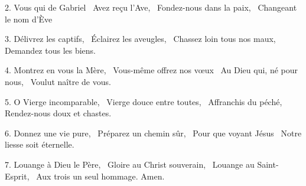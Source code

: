 \noindent
{}

{2. Vous qui de Gabriel~\newline
Avez reçu l'Ave,~\newline
Fondez-nous dans la paix,~\newline
Changeant le nom d'Ève~}

{3. Délivrez les captifs,~\newline
Éclairez les aveugles,~\newline
Chassez loin tous nos maux,~\newline
Demandez tous les biens.}

{4. Montrez en vous la Mère,~\newline
Vous-même offrez nos v{\oe}ux~\newline
Au Dieu qui, né pour nous,~\newline
Voulut naître de vous.}

{5. O Vierge incomparable,~\newline
Vierge douce entre toutes,~\newline
Affranchis du péché,~\newline
Rendez-nous doux et chastes.}

{6. Donnez une vie pure,~\newline
Préparez un chemin sûr,~\newline
Pour que voyant Jésus~\newline
Notre liesse soit éternelle.}

{7. Louange à Dieu le Père,~\newline
Gloire au Christ souverain,~\newline
Louange au Saint-Esprit,~\newline
Aux trois un seul hommage. Amen.}
